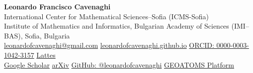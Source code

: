 \documentclass[10pt,a4paper]{article}
\begin{document}
\begin{center}
{\LARGE\bfseries Leonardo Francisco Cavenaghi}\\[4pt]
{\small International Center for Mathematical Sciences--Sofia (ICMS-Sofia)\\Institute of Mathematics and Informatics, Bulgarian Academy of Sciences (IMI--BAS), Sofia, Bulgaria}\\[4pt]
\href{mailto:leonardofcavenaghi@gmail.com}{leonardofcavenaghi@gmail.com}\quad\textbar\quad
\href{https://leonardofcavenaghi.github.io/}{leonardofcavenaghi.github.io}\quad\textbar\quad
\href{https://orcid.org/0000-0003-1042-3157}{ORCID: 0000-0003-1042-3157}\quad\textbar\quad
\href{http://lattes.cnpq.br/2750734381183404}{Lattes}\\
\href{https://scholar.google.com/citations?user=y4dja6sAAAAJ}{Google Scholar}\quad\textbar\quad
\href{https://arxiv.org/search/?searchtype=author\&query=Cavenaghi\%2C+Leonardo\&order=-announced_date_first\&size=50}{arXiv}\quad\textbar\quad
\href{https://github.com/leonardofcavenaghi}{GitHub: @leonardofcavenaghi}\quad\textbar\quad
\href{https://leonardofcavenaghi.github.io/atomicdecompositions/}{GEOATOMS Platform}
\end{center}
\vspace{-4pt}
\end{document}
